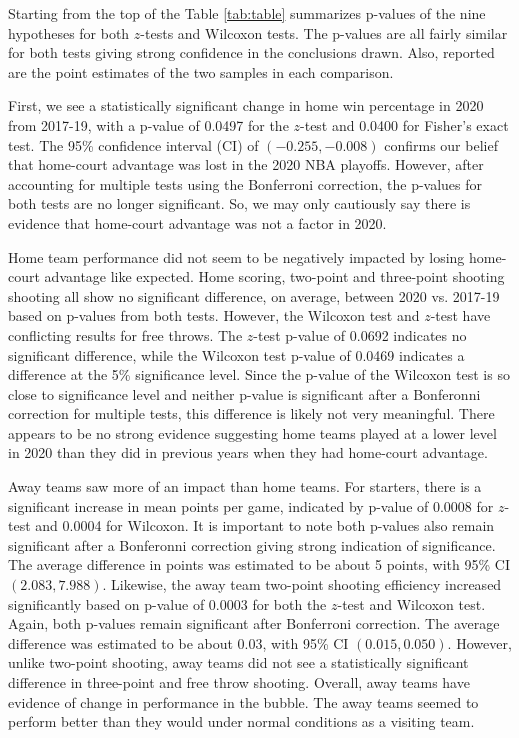 \documentclass[10pt]{article}
\begin{document}
Starting from the top of the
Table \ref{tab:table} summarizes p-values of the nine hypotheses for both
\(z\)-tests and Wilcoxon tests. The p-values are all fairly similar for both
tests giving strong confidence in the conclusions drawn. Also, reported are
the point estimates of the two samples in each comparison.

First, we see a statistically significant change
in home win percentage in 2020 from 2017-19, with a p-value of 0.0497 for the
\(z\)-test and 0.0400 for Fisher's exact test. The 95\% confidence
interval (CI) of \((-0.255, -0.008)\)
confirms our belief that home-court advantage was lost in the 2020 NBA 
playoffs. However, after accounting for
multiple tests using the Bonferroni correction, the p-values for both
tests are no longer significant. So, we may only cautiously say there is 
evidence that home-court advantage was
not a factor in 2020.

Home team performance did not seem to be negatively impacted by losing home-court
advantage like expected. Home scoring, two-point and three-point shooting
shooting all show no significant difference, on average, between 2020 vs.
2017-19 based on p-values from both tests. However, the Wilcoxon test and \(z\)-test have conflicting results
for free throws. The \(z\)-test p-value of 0.0692 indicates no significant difference, while
the Wilcoxon test p-value of 0.0469 indicates a difference at the 5\% significance level. Since
the p-value of the Wilcoxon test is so close to significance level and neither p-value is significant
after a Bonferonni correction for multiple tests, this difference is likely not very meaningful.
There appears to be no strong evidence suggesting home teams played at
a lower level in 2020 than they did in previous years when they had home-court advantage.

Away teams saw more of an impact than home teams. For starters, there is a
significant increase in mean points per game, indicated by p-value of 0.0008 for \(z\)-test and
0.0004 for Wilcoxon. It is important to note both p-values also remain significant after
a Bonferonni correction giving strong indication of significance. The average difference in points was estimated to
be about 5 points, with 95\% CI \((2.083, 7.988)\). Likewise, the away team two-point
shooting efficiency increased significantly based on p-value of 0.0003
for both the \(z\)-test and Wilcoxon test. Again, both p-values remain significant after Bonferroni correction.
The average difference was estimated to be about 0.03, with 95\% CI \((0.015, 0.050)\). However,
unlike two-point shooting, away teams did not see a statistically significant difference in three-point and free
throw shooting. Overall, away teams have evidence of change in performance in
the bubble. The away teams seemed to perform better than they would under normal
conditions as a visiting team.
\end{document}
